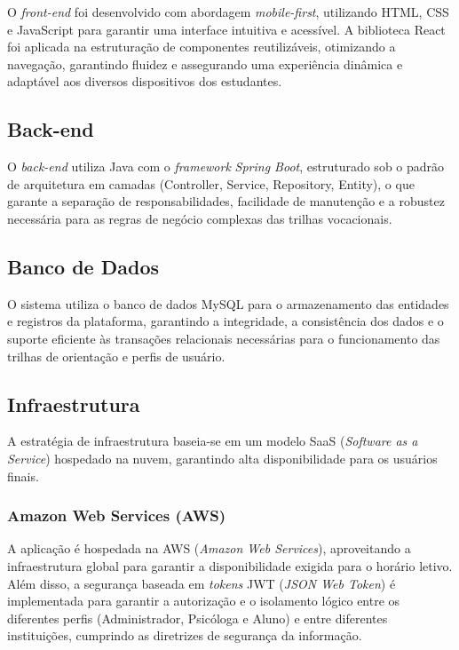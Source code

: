 O \textit{front-end} foi desenvolvido com abordagem \textit{mobile-first}, utilizando HTML, CSS e JavaScript para garantir uma interface intuitiva e acessível. A biblioteca React foi aplicada na estruturação de componentes reutilizáveis, otimizando a navegação, garantindo fluidez e assegurando uma experiência dinâmica e adaptável aos diversos dispositivos dos estudantes.

\subsection{Back-end}

O \textit{back-end} utiliza Java com o \textit{framework} \textit{Spring Boot}, estruturado sob o padrão de arquitetura em camadas (Controller, Service, Repository, Entity), o que garante a separação de responsabilidades, facilidade de manutenção e a robustez necessária para as regras de negócio complexas das trilhas vocacionais.

\subsection{Banco de Dados}

O sistema utiliza o banco de dados MySQL para o armazenamento das entidades e registros da plataforma, garantindo a integridade, a consistência dos dados e o suporte eficiente às transações relacionais necessárias para o funcionamento das trilhas de orientação e perfis de usuário.

\subsection{Infraestrutura}

A estratégia de infraestrutura baseia-se em um modelo SaaS (\textit{Software as a Service}) hospedado na nuvem, garantindo alta disponibilidade para os usuários finais.

\subsubsection{Amazon Web Services (AWS)}

A aplicação é hospedada na AWS (\textit{Amazon Web Services}), aproveitando a infraestrutura global para garantir a disponibilidade exigida para o horário letivo. Além disso, a segurança baseada em \textit{tokens} JWT (\textit{JSON Web Token}) é implementada para garantir a autorização e o isolamento lógico entre os diferentes perfis (Administrador, Psicóloga e Aluno) e entre diferentes instituições, cumprindo as diretrizes de segurança da informação.

